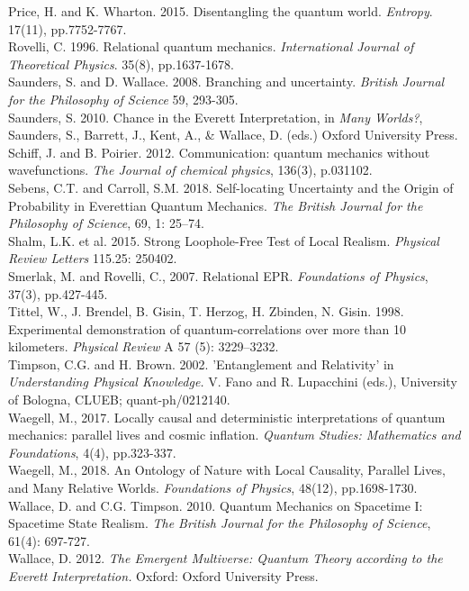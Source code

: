 \documentclass[12pt]{article}
\begin{document}
Price, H. and K. Wharton. 2015. Disentangling the quantum world. \textit{Entropy}. 17(11), pp.7752-7767.\\

Rovelli, C. 1996. Relational quantum mechanics. \textit{International Journal of Theoretical Physics}. 35(8), pp.1637-1678.\\

Saunders, S. and D. Wallace. 2008. Branching and uncertainty. \textit{British Journal for the
Philosophy of Science} 59, 293-305.\\

Saunders, S. 2010. Chance in the Everett Interpretation, in \textit{Many Worlds?}, Saunders, S., Barrett, J., Kent, A., \& Wallace, D. (eds.) Oxford University Press.\\

Schiff, J. and B. Poirier. 2012. Communication: quantum mechanics without wavefunctions. \textit{The Journal of chemical physics}, 136(3), p.031102.\\

Sebens, C.T. and Carroll, S.M. 2018. Self-locating Uncertainty and the Origin of Probability in Everettian Quantum Mechanics. \textit{The British Journal for the Philosophy of Science}, 69, 1: 25–74.\\

Shalm, L.K. et al. 2015. Strong Loophole-Free Test of Local Realism. \textit{Physical Review Letters} 115.25: 250402.\\

Smerlak, M. and Rovelli, C., 2007. Relational EPR. \textit{Foundations of Physics}, 37(3), pp.427-445.\\

Tittel, W., J. Brendel, B. Gisin, T. Herzog, H. Zbinden, N. Gisin. 1998. Experimental demonstration of quantum-correlations over more than 10 kilometers. \textit{Physical Review} A 57 (5): 3229–3232.\\

Timpson, C.G. and H. Brown. 2002. 
'Entanglement and Relativity' in \textit{Understanding Physical Knowledge.} V. Fano and R. Lupacchini (eds.), University of Bologna, CLUEB; quant-ph/0212140.\\

Waegell, M., 2017. Locally causal and deterministic interpretations of quantum mechanics: parallel lives and cosmic inflation. \textit{Quantum Studies: Mathematics and Foundations}, 4(4), pp.323-337.\\

Waegell, M., 2018. An Ontology of Nature with Local Causality, Parallel Lives, and Many Relative Worlds. \textit{Foundations of Physics}, 48(12), pp.1698-1730.\\

Wallace, D. and C.G. Timpson. 2010. Quantum Mechanics on Spacetime I: Spacetime State Realism. \textit{The British Journal for the Philosophy of Science}, 61(4): 697-727.\\

Wallace, D. 2012. \textit{The Emergent Multiverse: Quantum Theory according to the Everett Interpretation.} Oxford: Oxford University Press.\\
\end{document}
